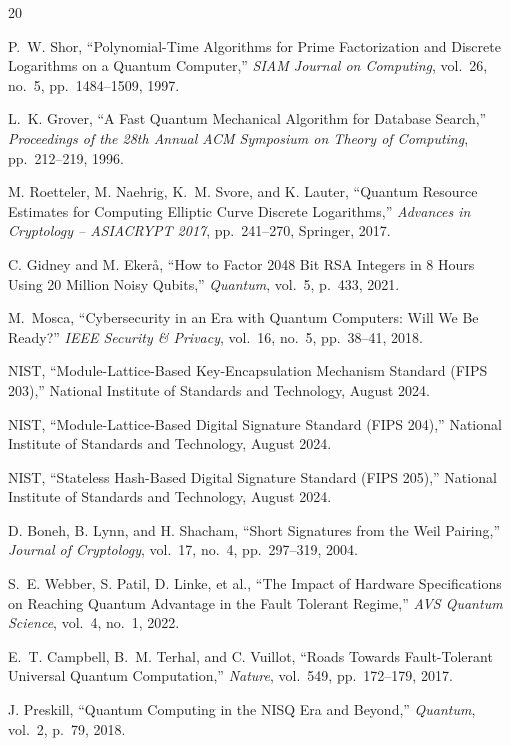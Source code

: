 \documentclass[11pt,a4paper]{article}
\begin{document}
\begin{thebibliography}{20}

P.~W. Shor, ``Polynomial-Time Algorithms for Prime Factorization and Discrete
Logarithms on a Quantum Computer,'' \emph{SIAM Journal on Computing}, vol.~26,
no.~5, pp.~1484--1509, 1997.

L.~K. Grover, ``A Fast Quantum Mechanical Algorithm for Database Search,''
\emph{Proceedings of the 28th Annual ACM Symposium on Theory of Computing},
pp.~212--219, 1996.

M. Roetteler, M. Naehrig, K.~M. Svore, and K. Lauter, ``Quantum Resource Estimates
for Computing Elliptic Curve Discrete Logarithms,'' \emph{Advances in Cryptology --
ASIACRYPT 2017}, pp.~241--270, Springer, 2017.

C. Gidney and M. Eker\aa, ``How to Factor 2048 Bit RSA Integers in 8 Hours Using
20 Million Noisy Qubits,'' \emph{Quantum}, vol.~5, p.~433, 2021.

M.~Mosca, ``Cybersecurity in an Era with Quantum Computers: Will We Be Ready?''
\emph{IEEE Security \& Privacy}, vol.~16, no.~5, pp.~38--41, 2018.

NIST, ``Module-Lattice-Based Key-Encapsulation Mechanism Standard (FIPS 203),''
National Institute of Standards and Technology, August 2024.

NIST, ``Module-Lattice-Based Digital Signature Standard (FIPS 204),''
National Institute of Standards and Technology, August 2024.

NIST, ``Stateless Hash-Based Digital Signature Standard (FIPS 205),''
National Institute of Standards and Technology, August 2024.

D. Boneh, B. Lynn, and H. Shacham, ``Short Signatures from the Weil Pairing,''
\emph{Journal of Cryptology}, vol.~17, no.~4, pp.~297--319, 2004.

S.~E. Webber, S. Patil, D. Linke, et al., ``The Impact of Hardware Specifications on
Reaching Quantum Advantage in the Fault Tolerant Regime,'' \emph{AVS Quantum Science},
vol.~4, no.~1, 2022.

E.~T. Campbell, B.~M. Terhal, and C. Vuillot, ``Roads Towards Fault-Tolerant Universal
Quantum Computation,'' \emph{Nature}, vol.~549, pp.~172--179, 2017.

J. Preskill, ``Quantum Computing in the NISQ Era and Beyond,'' \emph{Quantum},
vol.~2, p.~79, 2018.

\end{thebibliography}
\end{document}
